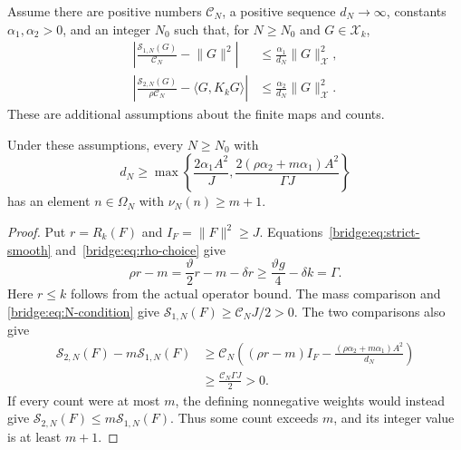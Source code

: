 \documentclass[11pt]{article}
\newcommand{\ip}[2]{\langle #1,#2\rangle}
\newcommand{\norm}[1]{\lVert #1\rVert}
\begin{document}
Assume there are positive numbers $\mathcal C_N$, a positive sequence
$d_N\to\infty$, constants $\alpha_1,\alpha_2>0$, and an integer $N_0$
such that, for $N\geq N_0$ and $G\in\mathcal X_k$,
\begin{align}
 \left|\frac{\mathscr S_{1,N}(G)}{\mathcal C_N}-\norm G^2\right|
 &\leq\frac{\alpha_1}{d_N}\norm G_{\mathcal X}^2,
 \label{bridge:eq:mass-assumption}\\
 \left|\frac{\mathscr S_{2,N}(G)}{\rho\mathcal C_N}-\ip G{K_kG}\right|
 &\leq\frac{\alpha_2}{d_N}\norm G_{\mathcal X}^2.
 \label{bridge:eq:energy-assumption}
\end{align}
These are additional assumptions about the finite maps and counts.

\begin{theorem}
Under\label{bridge:thm:counting} these assumptions, every $N\geq N_0$ with
\begin{equation}\label{bridge:eq:N-condition}
 d_N\geq\max\left\{\frac{2\alpha_1A^2}{J},
                \frac{2(\rho\alpha_2+m\alpha_1)A^2}{\Gamma J}\right\}
\end{equation}
has an element $n\in\Omega_N$ with $\nu_N(n)\geq m+1$.
\end{theorem}

\begin{proof}
Put $r=R_k(F)$ and $I_F=\norm F^2\geq J$.
Equations~\eqref{bridge:eq:strict-smooth} and~\eqref{bridge:eq:rho-choice}
give
\[
 \rho r-m
 =\frac\vartheta2r-m-\delta r
 \geq\frac{\vartheta g}{4}-\delta k
 =\Gamma.
\]
Here $r\leq k$ follows from the actual operator bound.
The mass comparison and \eqref{bridge:eq:N-condition} give
$\mathscr S_{1,N}(F)\geq\mathcal C_NJ/2>0$.
The two comparisons also give
\begin{align*}
 \mathscr S_{2,N}(F)-m\mathscr S_{1,N}(F)
 &\geq\mathcal C_N\left((\rho r-m)I_F
       -\frac{(\rho\alpha_2+m\alpha_1)A^2}{d_N}\right)\\
 &\geq\frac{\mathcal C_N\Gamma J}{2}>0.
\end{align*}
If every count were at most $m$, the defining nonnegative weights would
instead give $\mathscr S_{2,N}(F)\leq m\mathscr S_{1,N}(F)$.
Thus some count exceeds $m$, and its integer value is at least $m+1$.
\end{proof}
\end{document}
